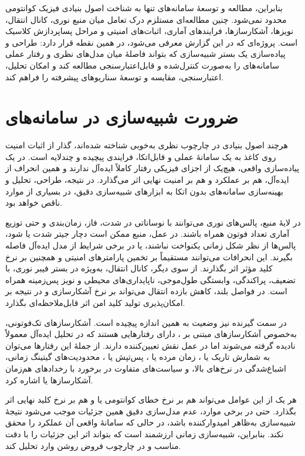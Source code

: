 بنابراین، مطالعه و توسعهٔ سامانه‌های  تنها به شناخت اصول بنیادی فیزیک کوانتومی محدود نمی‌شود. چنین مطالعه‌ای مستلزم درک تعامل میان منبع نوری، کانال انتقال، نویزها، آشکارسازها، فرایندهای آماری، اثبات‌های امنیتی و مراحل پساپردازش کلاسیک است. پروژه‌ای که در این گزارش معرفی می‌شود، در همین نقطه قرار دارد: طراحی و پیاده‌سازی یک بستر شبیه‌سازی که بتواند فاصلهٔ میان مدل‌های نظری و رفتار عملی سامانه‌های  را به‌صورت کنترل‌شده و قابل‌اعتبارسنجی مطالعه کند و امکان تحلیل، اعتبارسنجی، مقایسه و توسعهٔ سناریوهای پیشرفته را فراهم کند.

\section{ضرورت شبیه‌سازی در سامانه‌های }


هرچند اصول بنیادی  در چارچوب نظری به‌خوبی شناخته شده‌اند، گذار از اثبات امنیت روی کاغذ به یک سامانهٔ عملی و قابل‌اتکا، فرایندی پیچیده و چندلایه است. در یک پیاده‌سازی واقعی، هیچ‌یک از اجزای فیزیکی رفتار کاملاً ایده‌آل ندارند و همین انحراف از ایده‌آل، هم بر عملکرد و هم بر امنیت نهایی اثر می‌گذارد. در نتیجه، طراحی، تحلیل و بهینه‌سازی سامانه‌های  بدون اتکا به ابزارهای شبیه‌سازی دقیق، در بسیاری از موارد ناقص خواهد بود.

در لایهٔ منبع، پالس‌های نوری می‌توانند با نوساناتی در شدت، فاز، زمان‌بندی و حتی توزیع آماری تعداد فوتون همراه باشند. در عمل، منبع ممکن است دچار جیتر شدت یا  شود، پالس‌ها از نظر شکل زمانی یکنواخت نباشند، یا در برخی شرایط از مدل ایده‌آل فاصله بگیرند. این انحرافات می‌توانند مستقیماً بر تخمین پارامترهای امنیتی و همچنین بر نرخ کلید مؤثر اثر بگذارند. از سوی دیگر، کانال انتقال، به‌ویژه در بستر فیبر نوری، با تضعیف، پراکندگی، وابستگی طول‌موجی، ناپایداری‌های محیطی و نویز پس‌زمینه همراه است. در فواصل بلند، کاهش بازده انتقال می‌تواند بر نرخ آشکارسازی و در نتیجه بر امکان‌پذیری تولید کلید امن اثر قابل‌ملاحظه‌ای بگذارد.

در سمت گیرنده نیز وضعیت به همین اندازه پیچیده است. آشکارسازهای تک‌فوتونی، به‌خصوص آشکارسازهای مبتنی بر ، دارای رفتارهایی هستند که در تحلیل ایده‌آل معمولاً نادیده گرفته می‌شوند اما در عمل نقش تعیین‌کننده دارند. از جملهٔ این رفتارها می‌توان به شمارش تاریک یا ، زمان مرده یا ، پس‌تپش یا ، محدودیت‌های گیتینگ زمانی، اشباع‌شدگی در نرخ‌های بالا، و سیاست‌های متفاوت در برخورد با رخدادهای هم‌زمان آشکارسازها یا  اشاره کرد.

هر یک از این عوامل می‌تواند هم بر نرخ خطای کوانتومی یا  و هم بر نرخ کلید نهایی اثر بگذارد. حتی در برخی موارد، عدم مدل‌سازی دقیق همین جزئیات موجب می‌شود نتیجهٔ شبیه‌سازی به‌ظاهر امیدوارکننده باشد، در حالی که سامانهٔ واقعی آن عملکرد را محقق نکند. بنابراین، شبیه‌سازی زمانی ارزشمند است که بتواند اثر این جزئیات را با دقت مناسب و در چارچوب فروض روشن وارد تحلیل کند.

